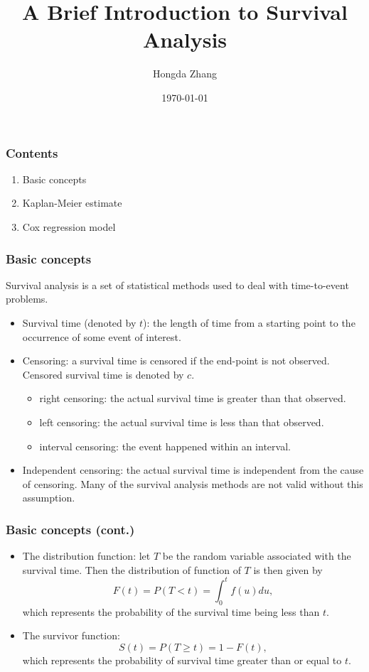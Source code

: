 \documentclass{beamer}
\title[]{A Brief Introduction to Survival Analysis}
\author[Hongda Zhang]{Hongda Zhang}
\institute{Nanjing University}
\date{\today}
\begin{document}
	\begin{frame}
		\titlepage
	\end{frame}
	
	\begin{frame}
		\frametitle{Contents}
		\begin{enumerate}
			\item Basic concepts
			\item Kaplan-Meier estimate
			\item Cox regression model
		\end{enumerate}
	\nocite{*}
	\end{frame}

	\begin{frame}
		\frametitle{Basic concepts}
		Survival analysis is a set of statistical methods used to deal with time-to-event problems.
		\begin{itemize}
			\item Survival time (denoted by $t$): the length of time from a starting point to the occurrence of some event of interest. 
			\item Censoring: a survival time is censored if the end-point is not observed. Censored survival time is denoted by $c$.
				\begin{itemize}
					\item right censoring: the actual survival time is greater than that observed.\\
					\item left censoring: the actual survival time is less than that observed.\\
					\item interval censoring: the event happened within an interval.
				\end{itemize}
			\item Independent censoring: the actual survival time is independent from the cause of censoring. Many of the survival analysis methods are not valid without this assumption.
		\end{itemize}
	\end{frame}

	\begin{frame}
		\frametitle{Basic concepts (cont.)}
		\begin{itemize}
			\item The distribution function: let $T$ be the random variable associated with the survival time. Then the distribution of function of $T$ is then given by 
			\[ F( t ) = P( T < t ) = \int_{ 0 }^{ t } f( u ) du,  \]
			which represents the probability of the survival time being less than $t$.
			\item The survivor function:
			\[ S(t) = P( T \geq t ) = 1 - F( t ), \]
			which represents the probability of survival time greater than or equal to $t$.
		\end{itemize}
	\end{frame}
\end{document}
